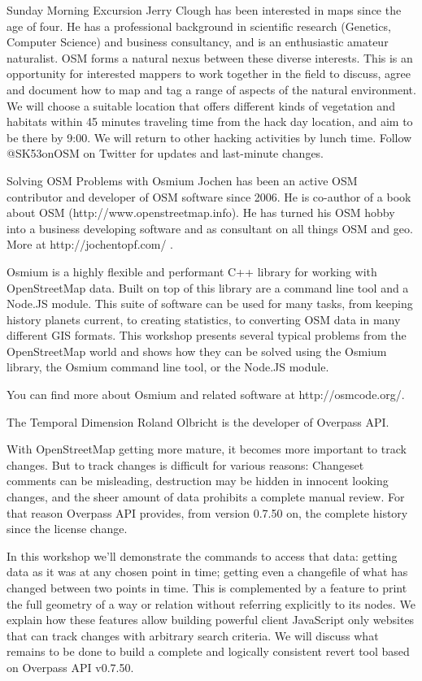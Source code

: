 
%
{Sunday Morning Excursion}%
{Jerry Clough has been interested in maps since the age of four. He has a professional background in scientific research (Genetics, Computer Science) and business consultancy, and is an enthusiastic amateur naturalist. OSM forms a natural nexus between these diverse interests. }%
{This is an opportunity for interested mappers to work together in the
field to discuss, agree and document how to map and tag a range of
aspects of the natural environment. We will choose a suitable location
that offers different kinds of vegetation and habitats within 45 minutes
traveling time from the hack day location, and aim to be there by 9:00.
We will return to other hacking activities by lunch time. Follow
@SK53onOSM on Twitter for updates and last-minute changes.}

%
{Solving OSM Problems with Osmium}%
{Jochen has been an active OSM contributor and developer of OSM software since 2006. He is co-author of a book about OSM (http://www.openstreetmap.info). He has turned his OSM hobby into a business developing software and as consultant on all things OSM and geo. More at http://jochentopf.com/ . }%
{Osmium is a highly flexible and performant C++ library for working with OpenStreetMap data. Built on top of this library are a command line tool and a Node.JS module. This suite of software can be used for many tasks, from keeping history planets current, to creating statistics, to converting OSM data in many different GIS formats. This workshop presents several typical problems from the OpenStreetMap world and shows how they can be solved using the Osmium library, the Osmium command line tool, or the Node.JS module. 

You can find more about Osmium and related software at http://osmcode.org/. }

%
{The Temporal Dimension}%
{Roland Olbricht is the developer of Overpass API. }%
{With OpenStreetMap getting more mature, it becomes more important to track changes. But to track changes is difficult for various reasons: Changeset comments can be misleading, destruction may be hidden in innocent looking changes, and the sheer amount of data prohibits a complete manual review. For that reason Overpass API provides, from version 0.7.50 on, the complete history since the license change. 

In this workshop we'll demonstrate the commands to access that data: getting data as it was at any chosen point in time; getting even a changefile of what has changed between two points in time. This is complemented by a feature to print the full geometry of a way or relation without referring explicitly to its nodes. We explain how these features allow building powerful client JavaScript only websites that can track changes with arbitrary search criteria. We will discuss what remains to be done to build a complete and logically consistent revert tool based on Overpass API v0.7.50. }


